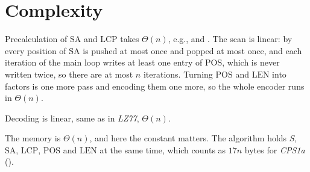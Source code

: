 \section{Complexity}

Precalculation of \(\mathrm{SA}\) and \(\mathrm{LCP}\) takes \(\Theta(n)\), e.g., \cite{nong2009} and \cite{kasai2001}. The scan is linear: by  every position of \(\mathrm{SA}\) is pushed at most once and popped at most once, and each iteration of the main loop writes at least one entry of \(\mathrm{POS}\), which is never written twice, so there are at most \(n\) iterations. Turning \(\mathrm{POS}\) and \(\mathrm{LEN}\) into factors is one more pass and encoding them one more, so the whole encoder runs in \(\Theta(n)\).

Decoding is linear, same as in \emph{LZ77}, \(\Theta(n)\).

The memory is \(\Theta(n)\), and here the constant matters. The algorithm holds \(S\), \(\mathrm{SA}\), \(\mathrm{LCP}\), \(\mathrm{POS}\) and \(\mathrm{LEN}\) at the same time, which counts as \(17n\) bytes for \emph{CPS1a} (\cite{chen2008}).